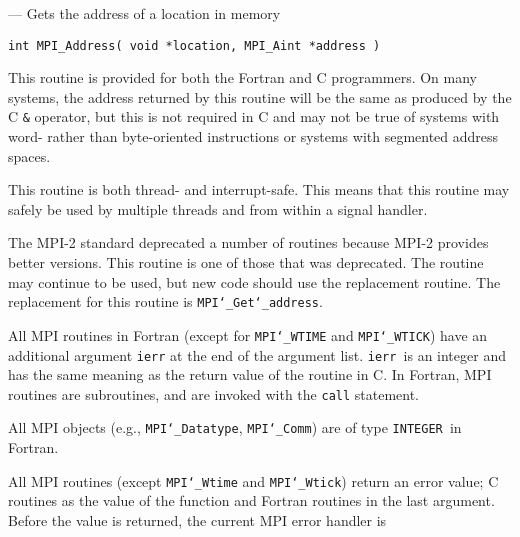 \startmanpage
{}
--- Gets the address of a location in memory   
\startvb\begin{verbatim}
int MPI_Address( void *location, MPI_Aint *address )

\end{verbatim}
\endvb

\par
{}
\par
{}
This routine is provided for both the Fortran and C programmers.
On many systems, the address returned by this routine will be the same
as produced by the C {\tt \&} operator, but this is not required in C and
may not be true of systems with word- rather than byte-oriented
instructions or systems with segmented address spaces.
\par
{}
\par
This routine is both thread- and interrupt-safe.
This means that this routine may safely be used by multiple threads and
from within a signal handler.
\par
{}
The MPI-2 standard deprecated a number of routines because MPI-2 provides
better versions.  This routine is one of those that was deprecated.  The
routine may continue to be used, but new code should use the replacement
routine.
The replacement for this routine is {\tt MPI{\tt \char`\_}Get{\tt \char`\_}address}.
\par
{}
All MPI routines in Fortran (except for {\tt MPI{\tt \char`\_}WTIME} and {\tt MPI{\tt \char`\_}WTICK}) have
an additional argument {\tt ierr} at the end of the argument list.  {\tt ierr
}is an integer and has the same meaning as the return value of the routine
in C.  In Fortran, MPI routines are subroutines, and are invoked with the
{\tt call} statement.
\par
All MPI objects (e.g., {\tt MPI{\tt \char`\_}Datatype}, {\tt MPI{\tt \char`\_}Comm}) are of type {\tt INTEGER
}in Fortran.
\par
{}
\par
All MPI routines (except {\tt MPI{\tt \char`\_}Wtime} and {\tt MPI{\tt \char`\_}Wtick}) return an error value;
C routines as the value of the function and Fortran routines in the last
argument.  Before the value is returned, the current MPI error handler is
